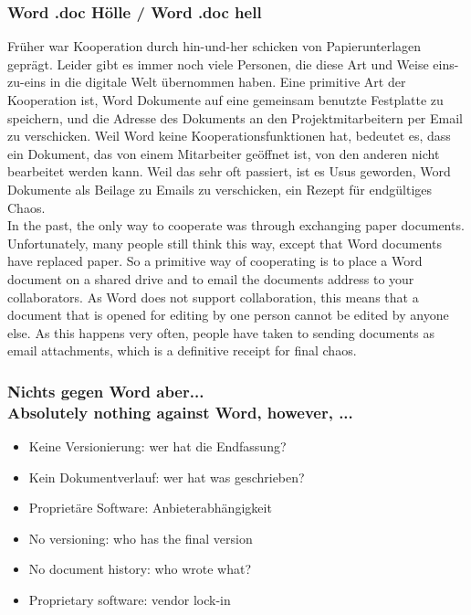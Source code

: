 \documentclass[12pt]{beamer}
\begin{document}
{\scriptsize
\begin{frame}
  \frametitle{Word\textsuperscript{\tiny\textregistered} .doc Hölle /
    \textcolor{mfn_green}{Word\textsuperscript{\tiny\textregistered} .doc hell}}
Früher war Kooperation durch hin-und-her schicken von Papierunterlagen geprägt. Leider gibt es immer noch viele Personen, die diese Art und Weise eins-zu-eins in die digitale Welt übernommen haben. Eine primitive Art der Kooperation ist, Word Dokumente auf eine gemeinsam benutzte Festplatte zu speichern, und die Adresse des Dokuments an den Projektmitarbeitern per Email zu verschicken. Weil Word keine Kooperationsfunktionen hat, bedeutet es, dass ein Dokument, das von einem Mitarbeiter geöffnet ist, von den anderen nicht bearbeitet werden kann. Weil das sehr oft passiert, ist es Usus geworden, Word Dokumente als Beilage zu Emails zu verschicken, ein Rezept für endgültiges Chaos.\\
  \bigskip
  \textcolor{mfn_green}{In the past, the only way to cooperate was through exchanging paper documents. Unfortunately, many people still think this way, except that Word documents have replaced paper. So a primitive way of cooperating is to place a Word document on a shared drive and to email the documents address to your collaborators. As Word does not support collaboration, this means that a document that is opened for editing by one person cannot be edited by anyone else. As this happens very often, people have taken to sending documents as email attachments, which is a definitive receipt for final chaos.}
\end{frame}
}
\begin{frame}
  \frametitle{Nichts gegen Word\textsuperscript{\tiny\textregistered} aber... \\
    \textcolor{mfn_green}{Absolutely nothing against Word\textsuperscript{\tiny\textregistered}, however, ...}}
  \begin{itemize}
  \item{Keine Versionierung: wer hat die Endfassung?}
  \item{Kein Dokumentverlauf: wer hat was geschrieben?}
  \item{Proprietäre Software: Anbieterabhängigkeit}
  \end{itemize}
  
  \begin{itemize}
  \item{\textcolor{mfn_green}{No versioning: who has the final version}}
  \item{\textcolor{mfn_green}{No document history: who wrote what?}}
  \item{\textcolor{mfn_green}{Proprietary software: vendor lock-in}}
  \end{itemize}
\end{frame}
\end{document}
